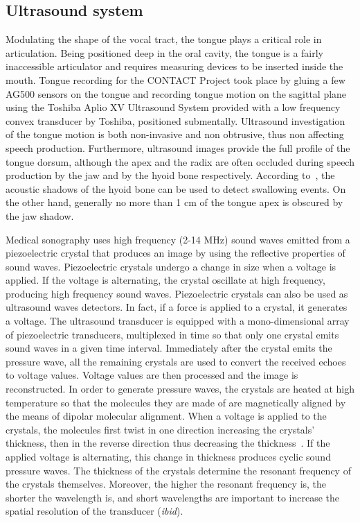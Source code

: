 \subsection{Ultrasound system}
\label{sec:linguometer:instrumentation:us}
Modulating the shape of the vocal tract, the tongue plays a critical role in
articulation.
Being positioned deep in the oral cavity, the tongue is a fairly inaccessible 
articulator and requires measuring devices to be inserted inside the mouth. 
Tongue recording for the CONTACT Project took place by gluing a few AG500
sensors on
the tongue and recording tongue motion on the sagittal plane using the Toshiba
Aplio XV Ultrasound System provided with a low frequency convex transducer by
Toshiba, positioned submentally.
Ultrasound investigation of the tongue motion is both non-invasive and non
obtrusive, thus non affecting speech production.
Furthermore, ultrasound images provide the full profile of the tongue
dorsum, although the apex and the radix are often occluded during speech
production
by the jaw and by the hyoid bone respectively. 
According to~\citet{stone:2005}, the acoustic shadows of the hyoid bone can be
used to detect swallowing events.
On the other hand, generally no more than 1 cm of the tongue apex is obscured
by the jaw shadow.

Medical sonography uses high frequency (2-14 MHz) sound waves emitted from a
piezoelectric crystal that produces an image by using the reflective properties
of sound waves.
Piezoelectric crystals undergo a change in size when a voltage is applied.
If the voltage is alternating, the crystal oscillate at high frequency,
producing high frequency sound waves.
Piezoelectric crystals can also be used as ultrasound waves detectors. 
In fact, if a force is applied to a crystal, it generates a voltage.
The ultrasound transducer is equipped with a mono-dimensional array of
piezoelectric transducers, multiplexed in time so that only one crystal emits
sound waves in a given time interval. Immediately after the crystal emits the
pressure wave, all the remaining crystals are used to convert the received 
echoes to voltage values. Voltage values are then processed and the image
is reconstructed.
In order to generate pressure waves, the crystals are heated at high 
temperature so that the molecules they are made of are magnetically aligned  
by the means of dipolar molecular alignment.
When a voltage is applied to the crystals, the molecules first twist in one
direction increasing the crystals' thickness, then in the reverse direction
thus decreasing the thickness~\citep{stone:2005}.
If the applied voltage is alternating, this change in 
thickness produces cyclic sound pressure waves.
The thickness of the crystals determine the resonant frequency of the crystals
themselves.
Moreover, the higher the resonant frequency is, the shorter the wavelength is,
and short wavelengths are important to increase the spatial resolution of the
transducer (\emph{ibid}).


